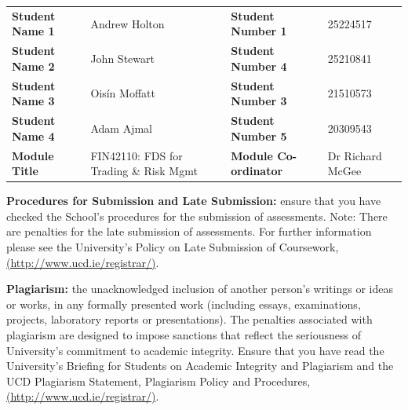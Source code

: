 \documentclass[11pt,a4paper]{article}
\begin{document}
\tableofcontents


\newpage

\begin{tabularx}{\textwidth}{>{\bfseries}l L >{\bfseries}l L}
\toprule
Student Name 1 & Andrew Holton     & Student Number 1 & 25224517  \\
Student Name 2 & John Stewart      & Student Number 4 & 25210841  \\
Student Name 3 & Ois\'{i}n Moffatt & Student Number 3 & 21510573  \\
Student Name 4 & Adam Ajmal        & Student Number 5 & 20309543  \\
Module Title & FIN42110: FDS for Trading \& Risk Mgmt & Module Co-ordinator & Dr Richard McGee \\
\bottomrule
\end{tabularx}

\vspace{1.2cm}

{\bfseries Procedures for Submission and Late Submission:} ensure that you have checked the School's procedures for the submission of assessments. Note: There are penalties for the late submission of assessments. For further information please see the University's Policy on Late Submission of Coursework, \href{http://www.ucd.ie/registrar/}{(http://www.ucd.ie/registrar/)}.

\vspace{0.7cm}

{\bfseries Plagiarism:} the unacknowledged inclusion of another person's writings or ideas or works, in any formally presented work (including essays, examinations, projects, laboratory reports or presentations). The penalties associated with plagiarism are designed to impose sanctions that reflect the seriousness of University's commitment to academic integrity. Ensure that you have read the University's Briefing for Students on Academic Integrity and Plagiarism and the UCD Plagiarism Statement, Plagiarism Policy and Procedures, \href{http://www.ucd.ie/registrar/}{(http://www.ucd.ie/registrar/)}.
\end{document}
